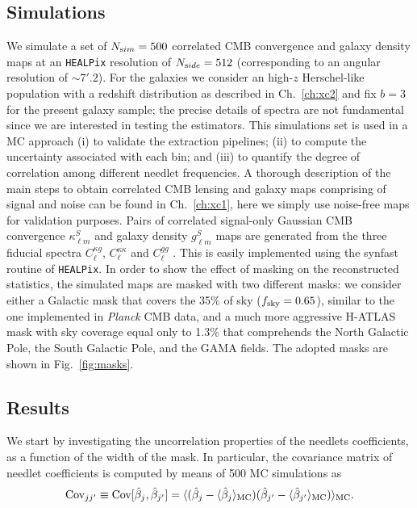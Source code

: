 \subsection{Simulations}
\label{sec:sims}
We simulate a set of $N_{\rm sim}=500$ correlated \gls{CMB} convergence and galaxy density maps at an 
\texttt{HEALPix} resolution of $N_{\rm side} = 512$ (corresponding to an angular resolution of $\sim 7'.2$). 
For the galaxies we consider an high-$z$ Herschel-like 
population with a redshift distribution as described in Ch.~\eqref{ch:xc2} and fix $b=3$ for the present 
galaxy sample; the precise details of spectra are not fundamental since we are interested in testing the 
estimators. This simulations set is used in a \gls{MC} 
approach (i) to validate the extraction pipelines; (ii) to compute the uncertainty associated with each bin; 
and (iii) to quantify the degree of correlation among different needlet frequencies. A thorough description 
of the main steps to obtain correlated \gls{CMB} lensing and galaxy maps comprising of signal and noise can 
be found in Ch.~\eqref{ch:xc1}, here we simply use noise-free maps for validation purposes. 
Pairs of correlated signal-only Gaussian CMB convergence $\kappa^S_{\ell m}$ and galaxy density 
$g^S_{\ell m}$ maps are generated from the three fiducial spectra $C^{\kappa g}_{\ell}$, $C^{\kappa
\kappa}_{\ell}$ and $C^{gg}_{\ell}$ \citep{Giannantonio2008,Bianchini2015}. This is easily implemented 
using the synfast routine of \texttt{HEALPix}.
In order to show the effect of masking on the reconstructed statistics, the simulated maps are
masked with two different masks: we consider either a Galactic mask that covers the 35\% of sky 
($f_{\rm{sky}} = 0.65$), similar to the one implemented in \textit{Planck} \gls{CMB} data, and a much more 
aggressive H-ATLAS \citep{Eales2010a} mask with 
sky coverage equal only to 1.3\% that comprehends the North Galactic Pole, the South Galactic Pole, and 
the GAMA fields. The adopted masks are shown in Fig.~\eqref{fig:masks}.

\subsection{Results}
\label{sec:results}
We start by investigating the uncorrelation properties of the needlets coefficients, as a function of the width of the mask. In particular, the covariance matrix of needlet coefficients is computed by means of 500 MC simulations as 
%
\begin{equation}
\text{Cov}_{jj'} \equiv \text{Cov}[\hat{\beta}_{j},\hat{\beta}_{j'}] = \langle(\hat{\beta}_j-\langle \hat{\beta}_j\rangle_{\rm{MC}})(\hat{\beta}_{j
'}-\langle\hat{\beta}_{j'}\rangle_{\rm{MC}}) \rangle_{\rm{MC}}.
\end{equation}
%

